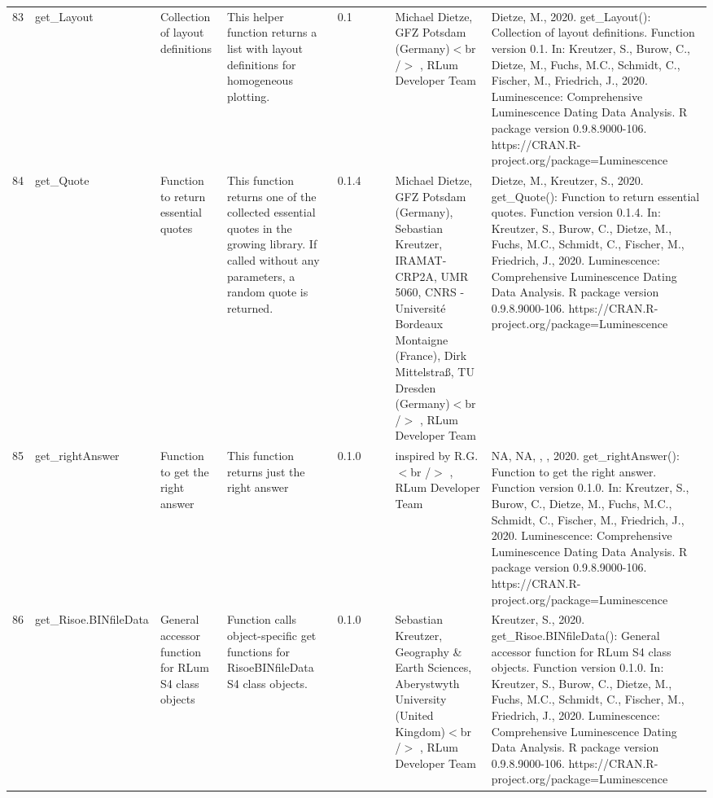 \begin{table}[ht]
\begin{tabular}{rllllllll}
 \\ 
  83 & get\_Layout & Collection of layout definitions & This helper function returns a list with layout definitions for homogeneous plotting. & 0.1
 &  &  & Michael Dietze, GFZ Potsdam (Germany)$<$br /$>$ , RLum Developer Team & Dietze, M., 2020. get\_Layout(): Collection of layout definitions. Function version 0.1. In: Kreutzer, S., Burow, C., Dietze, M., Fuchs, M.C., Schmidt, C., Fischer, M., Friedrich, J., 2020. Luminescence: Comprehensive Luminescence Dating Data Analysis. R package version 0.9.8.9000-106. https://CRAN.R-project.org/package=Luminescence
 \\ 
  84 & get\_Quote & Function to return essential quotes & This function returns one of the collected essential quotes in the growing library. If called without any parameters, a random quote is returned. & 0.1.4
 &  &  & Michael Dietze, GFZ Potsdam (Germany), Sebastian Kreutzer, IRAMAT-CRP2A, UMR 5060, CNRS - Université Bordeaux Montaigne (France), Dirk Mittelstraß, TU Dresden (Germany)$<$br /$>$ , RLum Developer Team & Dietze, M., Kreutzer, S., 2020. get\_Quote(): Function to return essential quotes. Function version 0.1.4. In: Kreutzer, S., Burow, C., Dietze, M., Fuchs, M.C., Schmidt, C., Fischer, M., Friedrich, J., 2020. Luminescence: Comprehensive Luminescence Dating Data Analysis. R package version 0.9.8.9000-106. https://CRAN.R-project.org/package=Luminescence
 \\ 
  85 & get\_rightAnswer & Function to get the right answer & This function returns just the right answer & 0.1.0
 &  &  & inspired by R.G.$<$br /$>$ , RLum Developer Team & NA, NA, , , 2020. get\_rightAnswer(): Function to get the right answer. Function version 0.1.0. In: Kreutzer, S., Burow, C., Dietze, M., Fuchs, M.C., Schmidt, C., Fischer, M., Friedrich, J., 2020. Luminescence: Comprehensive Luminescence Dating Data Analysis. R package version 0.9.8.9000-106. https://CRAN.R-project.org/package=Luminescence
 \\ 
  86 & get\_Risoe.BINfileData & General accessor function for RLum S4 class objects & Function calls object-specific get functions for RisoeBINfileData S4 class objects. & 0.1.0
 &  &  & Sebastian Kreutzer, Geography \& Earth Sciences, Aberystwyth University (United Kingdom)$<$br /$>$ , RLum Developer Team & Kreutzer, S., 2020. get\_Risoe.BINfileData(): General accessor function for RLum S4 class objects. Function version 0.1.0. In: Kreutzer, S., Burow, C., Dietze, M., Fuchs, M.C., Schmidt, C., Fischer, M., Friedrich, J., 2020. Luminescence: Comprehensive Luminescence Dating Data Analysis. R package version 0.9.8.9000-106. https://CRAN.R-project.org/package=Luminescence

\end{tabular}
\end{table}
